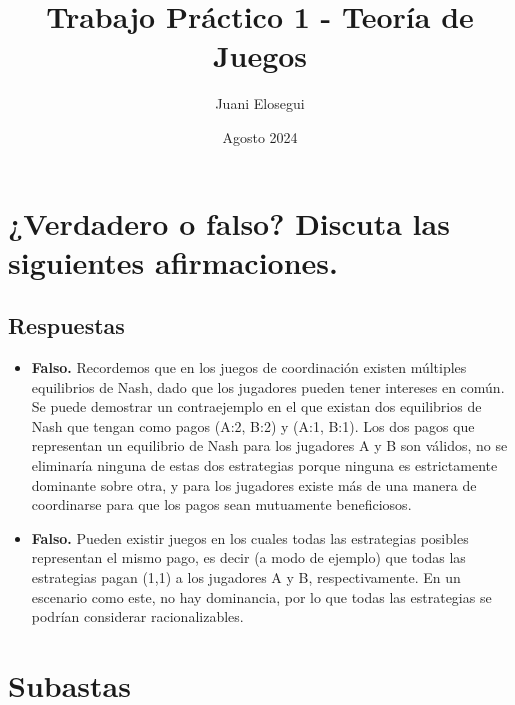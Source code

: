 \documentclass{article}
\title{Trabajo Práctico 1 - Teoría de Juegos}
\author{Juani Elosegui}
\date{Agosto 2024}
\begin{document}
    \maketitle

    \newpage
    
    \section{¿Verdadero o falso? Discuta las siguientes afirmaciones.}
        \subsection*{Respuestas}
            \begin{itemize}
                \item \textbf{Falso.} Recordemos que en los juegos de coordinación existen múltiples equilibrios de Nash, dado que los jugadores pueden tener intereses en común. Se puede demostrar un contraejemplo en el que existan dos equilibrios de Nash que tengan como pagos (A:2, B:2) y (A:1, B:1). Los dos pagos que representan un equilibrio de Nash para los jugadores A y B son válidos, no se eliminaría ninguna de estas dos estrategias porque ninguna es estrictamente dominante sobre otra, y para los jugadores existe más de una manera de coordinarse para que los pagos sean mutuamente beneficiosos.

                \item \textbf{Falso.} Pueden existir juegos en los cuales todas las estrategias posibles representan el mismo pago, es decir (a modo de ejemplo) que todas las estrategias pagan (1,1) a los jugadores A y B, respectivamente. En un escenario como este, no hay dominancia, por lo que todas las estrategias se podrían considerar racionalizables.
            \end{itemize}

    \section{Subastas}
\end{document}

